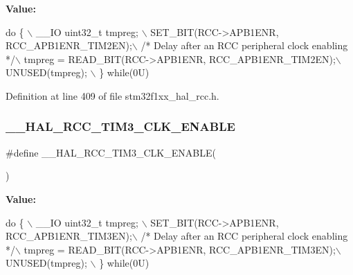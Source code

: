 {\bfseries Value\+:}
\begin{DoxyCode}
\textcolor{keywordflow}{do} \{ \(\backslash\)
                                        \_\_IO uint32\_t tmpreg; \(\backslash\)
                                        SET\_BIT(RCC->APB1ENR, RCC\_APB1ENR\_TIM2EN);\(\backslash\)
                                        \textcolor{comment}{/* Delay after an RCC peripheral clock enabling */}\(\backslash\)
                                        tmpreg = READ\_BIT(RCC->APB1ENR, RCC\_APB1ENR\_TIM2EN);\(\backslash\)
                                        UNUSED(tmpreg); \(\backslash\)
                                      \} \textcolor{keywordflow}{while}(0U)
\end{DoxyCode}


Definition at line 409 of file stm32f1xx\+\_\+hal\+\_\+rcc.\+h.

\mbox{\label{group___r_c_c___a_p_b1___clock___enable___disable_gaf62d32fdde03df10072d856515692c8d}} 
\subsubsection{\texorpdfstring{\+\_\+\+\_\+\+H\+A\+L\+\_\+\+R\+C\+C\+\_\+\+T\+I\+M3\+\_\+\+C\+L\+K\+\_\+\+E\+N\+A\+B\+LE}{\_\_HAL\_RCC\_TIM3\_CLK\_ENABLE}}
{\footnotesize\ttfamily \#define \+\_\+\+\_\+\+H\+A\+L\+\_\+\+R\+C\+C\+\_\+\+T\+I\+M3\+\_\+\+C\+L\+K\+\_\+\+E\+N\+A\+B\+LE(\begin{DoxyParamCaption}{ }\end{DoxyParamCaption})}

{\bfseries Value\+:}
\begin{DoxyCode}
\textcolor{keywordflow}{do} \{ \(\backslash\)
                                        \_\_IO uint32\_t tmpreg; \(\backslash\)
                                        SET\_BIT(RCC->APB1ENR, RCC\_APB1ENR\_TIM3EN);\(\backslash\)
                                        \textcolor{comment}{/* Delay after an RCC peripheral clock enabling */}\(\backslash\)
                                        tmpreg = READ\_BIT(RCC->APB1ENR, RCC\_APB1ENR\_TIM3EN);\(\backslash\)
                                        UNUSED(tmpreg); \(\backslash\)
                                      \} \textcolor{keywordflow}{while}(0U)
\end{DoxyCode}


